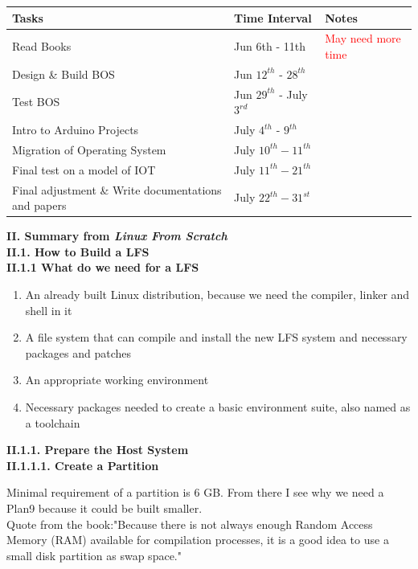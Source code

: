 \documentclass[a4paper,12pt]{report}
\begin{document}
\noindent
\begin{tabular}{l | l | l} 
 \textbf{Tasks} & \textbf{Time Interval} & \textbf{Notes}  \\
 \hline 
 Read Books & Jun 6th - 11th & \textcolor{red}{May need more time}\\
 Design \& Build BOS & Jun $12^{th}$ - $28^{th}$ & \\  
 Test BOS & Jun $29^{th}$ - July $3^{rd}$& \\
 Intro to Arduino Projects & July $4^{th}$ - $9^{th}$ &  \\
 Migration of Operating System & July $10^{th} - 11^{th}$ & \\
 Final test on a model of IOT & July $11^{th} - 21^{th}$ & \\
 Final adjustment \& Write documentations and papers & July $22^{th}-31^{st}$ & 
\end{tabular}

\noindent
\textbf{II. Summary from \textit{Linux From Scratch}}\\

\noindent
\textbf{II.1. How to Build a LFS}\\

\noindent
\textbf{II.1.1 What do we need for a LFS}

\begin{enumerate}
\item An already built Linux distribution, because we need the compiler, linker and shell in it
\item A file system that can compile and install the new LFS system and necessary packages and patches
\item An appropriate working environment
\item Necessary packages needed to create a basic environment suite, also named as a toolchain
\end{enumerate}

\noindent
\textbf{II.1.1. Prepare the Host System}\\

\noindent 
\textbf{II.1.1.1. Create a Partition}

\noindent
Minimal requirement of a partition is 6 GB. From there I see why we need a Plan9 because it could be built smaller. \\

\noindent
Quote from the book:"Because there is not always enough Random Access Memory (RAM) available for compilation processes, it is a good
idea to use a small disk partition as swap space."
\end{document}
